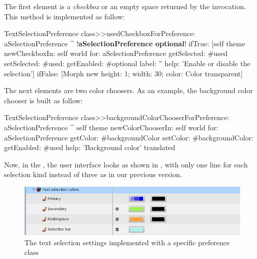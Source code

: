 \documentclass[a4paper,10pt,twoside]{book}
\begin{document}
{The first element is a \textit{checkbox} or an empty space returned by the  invocation. This method is implemented as follow:
\begin{code}{}
TextSelectionPreference class>>usedCheckboxForPreference: aSelectionPreference 
	^ !\textbf{aSelectionPreference optional}!
		ifTrue: [self theme
				newCheckboxIn: self world
				for: aSelectionPreference
				getSelected: #used
				setSelected: #used:
				getEnabled: #optional
				label: ''
				help: 'Enable or disable the selection']
		ifFalse: [Morph new height: 1;
				 width: 30;
				 color: Color transparent]
\end{code}
The next elements are two color choosers. As an example, the background color chooser is built as follow:
\begin{code}{}
TextSelectionPreference class>>backgroundColorChooserForPreference: aSelectionPreference 
	^ self theme
		newColorChooserIn: self world
		for: aSelectionPreference
		getColor: #backgroundColor
		setColor: #backgroundColor:
		getEnabled: #used
		help: 'Background color' translated
\end{code}
Now, in the \setbrowser, the user interface looks as shown in , with only one line for each selection kind instead of three as in our previous version. 
\begin{figure}[tbh]
\begin{center}
\includegraphics[scale=0.45]{textSelectionColorSettings}
\caption{The text selection settings implemented with a specific preference class}
\end{center}
\end{figure}

}
\end{document}
